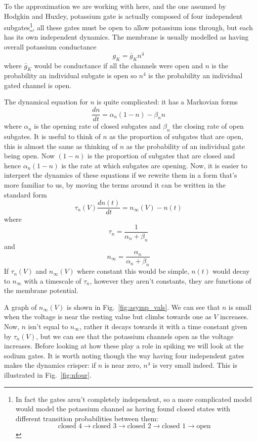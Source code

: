 \documentclass[12pt]{article}
\begin{document}
To the approximation we are working with here, and the one assumed by Hodgkin and Huxley, potassium gate is actually composed of four independent subgates\footnote{In fact the gates aren't completely independent, so a more complicated model would model the potassium channel as having found closed states with different transition probabilities between them:
  $$\mbox{closed 4}\rightarrow\mbox{closed 3}\rightarrow\mbox{closed
    2}\rightarrow\mbox{closed 1}\rightarrow\mbox{open}$$ }, all these
gates must be open to allow potassium ions through, but each has its
own independent dynamics. The membrane is usually modelled as having
overall potassium conductance
\begin{equation}
g_{K}=\bar{g}_Kn^4
\end{equation}
where $\bar{g}_K$ would be conductance if all the channels were open
and $n$ is the probability an individual subgate is open so $n^4$ is
the probability an individual gated channel is open.

The dynamical equation for $n$ is quite complicated: it has a Markovian forms
\begin{equation}
  \frac{dn}{dt}=\alpha_n(1-n)-\beta_nn
\end{equation}
where $\alpha_n$ is the opening rate of closed subgates and $\beta_n$
the closing rate of open subgates. It is useful to think of $n$ as the
proportion of subgates that are open, this is almost the same as
thinking of $n$ as the probability of an individual gate being
open. Now $(1-n)$ is the proportion of subgates that are closed and
hence $\alpha_n(1-n)$ is the rate at which subgates are opening. Now,
it is easier to interpret the dynamics of these equations if we
rewrite them in a form that's more familiar to us, by moving the terms
around it can be written in the standard form
\begin{equation}
\tau_n(V)\frac{dn(t)}{dt}=n_\infty(V)-n(t)
\end{equation}
where
\begin{equation}
  \tau_n=\frac{1}{\alpha_n+\beta_n}
\end{equation}
and
\begin{equation}
  n_\infty=\frac{\alpha_n}{\alpha_n+\beta_n}
\end{equation}
If $\tau_n(V)$ and $n_\infty(V)$ where constant this would be simple,
$n(t)$ would decay to $n_\infty$ with a timescale of $\tau_n$, however
they aren't constants, they are functions of the membrane potential. 

A graph of $n_\infty(V)$ is shown in Fig.~\ref{fig:asymp_vals}. We can
see that $n$ is small when the voltage is near the resting value but
climbs towards one as $V$ increases. Now, $n$ isn't equal to
$n_\infty$, rather it decays towards it with a time constant given by
$\tau_n(V)$, but we can see that the potassium channels open as the
voltage increases. Before looking at how these play a role in spiking
we will look at the sodium gates. It is worth noting though the way
having four independent gates makes the dynamics crisper: if $n$ is
near zero, $n^4$ is very small indeed. This is illustrated in
Fig.~\ref{fig:nfour}.
\end{document}

